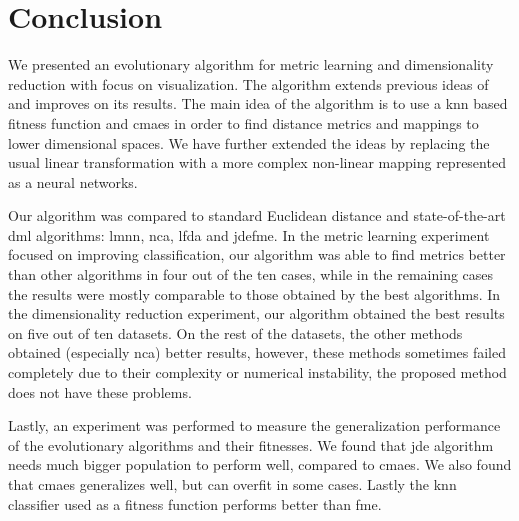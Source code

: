\documentclass[12pt,a4paper]{report}
\begin{document}








\chapter{Conclusion} \label{chap:conclusion}

We presented an evolutionary algorithm for metric learning and dimensionality reduction with focus on visualization. The algorithm extends previous ideas of \citep{fukui2013evolutionary} and improves on its results. The main idea of the algorithm is to use a \ac{knn} based fitness function and \ac{cmaes} in order to find distance metrics and mappings to lower dimensional spaces. We have further extended the ideas by replacing the usual linear transformation with a more complex non-linear mapping represented as a neural networks.

Our algorithm was compared to standard Euclidean distance and state-of-the-art \acl{dml} algorithms: \ac{lmnn}, \ac{nca}, \ac{lfda} and \ac{jdefme}. In the metric learning experiment focused on improving classification, our algorithm was able to find metrics better than other algorithms in four out of the ten cases, while in the remaining cases the results were mostly comparable to those obtained by the best algorithms. In the dimensionality reduction experiment, our algorithm obtained the best results on five out of ten datasets. On the rest of the datasets, the other methods obtained (especially \ac{nca}) better results, however, these methods sometimes failed completely due to their complexity or numerical instability, the proposed method does not have these problems.

Lastly, an experiment was performed to measure the generalization performance of the evolutionary algorithms and their fitnesses. We found that \ac{jde} algorithm needs much bigger population to perform well, compared to \ac{cmaes}. We also found that \ac{cmaes} generalizes well, but can overfit in some cases. Lastly the \ac{knn} classifier used as a fitness function performs better than \acl{fme}.
\end{document}
